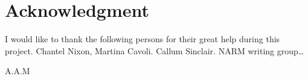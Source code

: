 \section*{Acknowledgment}
I would like to thank the following persons for their great help during this project. Chantel Nixon, Martina Cavoli. Callum Sinclair. NARM writing group\ldots



\begin{flushright}
A.A.M\\[1pc]

\end{flushright}